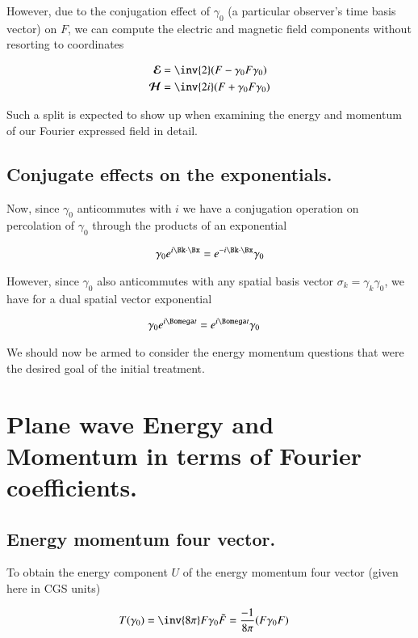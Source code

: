 However, due to the conjugation effect of $\gamma_0$
(a particular observer's time basis vector)
on $F$,
we can compute the electric and magnetic field components without resorting to coordinates

\begin{align}
\EE &= \inv{2}(F - \gamma_0 F \gamma_0 ) \\
\HH &= \inv{2i}(F + \gamma_0 F \gamma_0 )
\end{align}

Such a split is expected to show up when examining the energy and momentum of our Fourier expressed field in detail.

\subsection{Conjugate effects on the exponentials. }

Now, since $\gamma_0$ anticommutes with $i$ we have a conjugation operation on percolation of $\gamma_0$ through the products of an exponential

\begin{align}
\gamma_0 e^{i \Bk \cdot \Bx} = e^{-i \Bk \cdot \Bx} \gamma_0
\end{align}

However, since $\gamma_0$ also anticommutes with any spatial basis vector $\sigma_k = \gamma_k \gamma_0$, we have for a dual spatial vector exponential

\begin{align}
\gamma_0 e^{i \Bomega t} &= e^{i \Bomega t} \gamma_0
\end{align}

We should now be armed to consider the energy momentum questions that were the desired goal of the initial treatment.

\section{Plane wave Energy and Momentum in terms of Fourier coefficients. }

\subsection{Energy momentum four vector. }

To obtain the energy component $U$ of the energy momentum four
vector (given here in CGS units)

\begin{align}
T(\gamma_0) &= \inv{8\pi} F \gamma_0 \tilde{F} = \frac{-1}{8\pi}(F \gamma_0 F)
\end{align}

